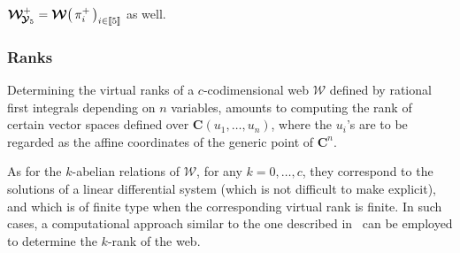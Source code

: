 \documentclass[11pt]{amsart}
\newcommand{\sk}{\smallskip}
\begin{document}
$\boldsymbol{\mathcal W}^{+}_{\hspace{-0.05cm}\boldsymbol{\mathcal Y}_5}=
\boldsymbol{\mathcal W}\big( \, \pi_i^+ \,\big)_{i\in [\hspace{-0.05cm}[5]\hspace{-0.05cm}]} $  as well. 





\subsubsection{\bf Ranks}
Determining the virtual ranks of a $c$-codimensional web
$\boldsymbol{\mathcal W}$ defined by rational first integrals depending on $n$  variables, amounts to computing the rank of certain vector spaces defined over 
 $\mathbf C(u_1,\ldots,u_n)$, where the $u_i$'s are to be regarded as the affine coordinates of the generic point of $ \mathbf{C}^n$.

As for the $k$-abelian relations of  $\boldsymbol{\mathcal{W}}$, for any $k = 0, \ldots, c$, they correspond to the solutions of a linear differential system (which is not difficult to make explicit), and which is of finite type when the corresponding virtual rank is finite. In such cases, a computational approach similar to the one described in~\cite[\S1.5]{ClusterWebs} can be employed to determine the $k$-rank of the web.
\sk 
\end{document}
